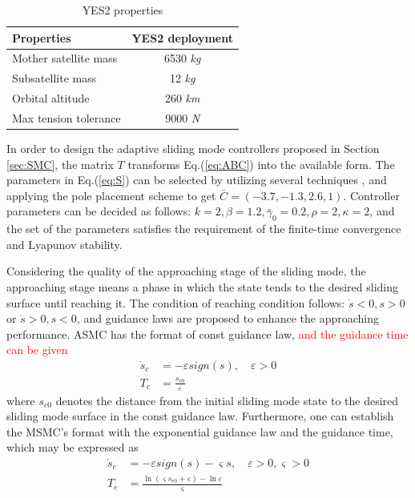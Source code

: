 \documentclass[3p]{elsarticle}
\theoremstyle{plain}
\begin{document}
\begin{table}[h]
\begin{center}
\caption{YES2 properties}\label{ta:properites}
\begin{tabular}{lc}
\toprule
Properties              &YES2 deployment\\
\midrule
Mother satellite mass   &6530 \textit{kg}\\
Subsatellite mass       &12 \textit{kg}\\
Orbital altitude        &260 \textit{km}\\
Max tension tolerance   &9000 \textit{N}\\
\bottomrule
\end{tabular}
\end{center}
\end{table}
In order to design the adaptive sliding mode controllers proposed in Section {\ref{sec:SMC}}, the matrix $T$ transforms Eq.(\ref{eq:ABC}) into the available form. The parameters in Eq.(\ref{eq:S}) can be selected by utilizing several techniques \cite{Aggoune1994Design,Lin1993A}, and applying the pole placement scheme to get $\bar{C} = (-3.7,-1.3 ,2.6,1)$. Controller parameters can be decided as follows: $k = 2,\beta = 1.2,\bar{\gamma}_0=0.2,\rho = 2,\kappa=2$, and the set of the parameters satisfies the requirement of the finite-time convergence and Lyapunov stability.\par
Considering the quality of the approaching stage of the sliding mode, the approaching stage means a phase in which the state tends to the desired sliding surface until reaching it. The condition of reaching condition follows: $\dot{s}<0,s>0$ or $\dot{s}>0,s<0$, and guidance laws are proposed to enhance the approaching performance. ASMC has the format of const guidance law, \textcolor{red}{and the guidance time can be given}
\begin{align}
\dot{s}_c &= -\varepsilon sign(s),\quad \varepsilon>0\label{eq:sc}\\
T_c &= \frac{s_{c0}}{\varepsilon}
\end{align}
where $s_{c0}$ denotes the distance from the initial sliding mode state to the desired sliding mode surface in the const guidance law. Furthermore, one can establish the MSMC's format with the exponential guidance law and the guidance time, which may be expressed as
\begin{align}
\dot{s}_e &= -\varepsilon sign(s)-\varsigma s,\quad \varepsilon>0,\varsigma>0\\
T_e &= \frac{\ln (\varsigma s_{e0}+\varepsilon)-\ln\varepsilon}{\varsigma}
\end{align}
\end{document}
